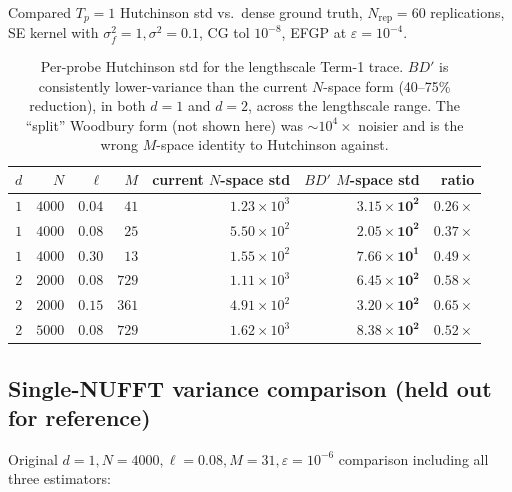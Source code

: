 \documentclass[11pt]{article}
\begin{document}
Compared $T_p=1$ Hutchinson std vs.\ dense ground truth, $N_{\text{rep}}=60$ replications, SE kernel with $\sigma_f^2=1, \sigma^2=0.1$, CG tol $10^{-8}$, EFGP at $\varepsilon=10^{-4}$.

\begin{table}[h]
\centering
\begin{tabular}{rrrrrrr}
\toprule
$d$ & $N$ & $\ell$ & $M$ & current $N$-space std & $BD'$ $M$-space std & ratio \\
\midrule
$1$ & $4000$ & $0.04$ & $41$  & $1.23\!\times\!10^{3}$ & $\mathbf{3.15\!\times\!10^{2}}$ & $\mathbf{0.26}\times$ \\
$1$ & $4000$ & $0.08$ & $25$  & $5.50\!\times\!10^{2}$ & $\mathbf{2.05\!\times\!10^{2}}$ & $\mathbf{0.37}\times$ \\
$1$ & $4000$ & $0.30$ & $13$  & $1.55\!\times\!10^{2}$ & $\mathbf{7.66\!\times\!10^{1}}$ & $\mathbf{0.49}\times$ \\
$2$ & $2000$ & $0.08$ & $729$ & $1.11\!\times\!10^{3}$ & $\mathbf{6.45\!\times\!10^{2}}$ & $\mathbf{0.58}\times$ \\
$2$ & $2000$ & $0.15$ & $361$ & $4.91\!\times\!10^{2}$ & $\mathbf{3.20\!\times\!10^{2}}$ & $\mathbf{0.65}\times$ \\
$2$ & $5000$ & $0.08$ & $729$ & $1.62\!\times\!10^{3}$ & $\mathbf{8.38\!\times\!10^{2}}$ & $\mathbf{0.52}\times$ \\
\bottomrule
\end{tabular}
\caption{Per-probe Hutchinson std for the lengthscale Term-1 trace. $BD'$ is consistently lower-variance than the current $N$-space form (40--75\% reduction), in both $d=1$ and $d=2$, across the lengthscale range. The ``split'' Woodbury form (not shown here) was $\sim 10^4\times$ noisier and is the wrong $M$-space identity to Hutchinson against.}
\end{table}

\subsection{Single-NUFFT variance comparison (held out for reference)}

Original $d=1, N=4000, \ell=0.08, M=31, \varepsilon=10^{-6}$ comparison including all three estimators:
\end{document}
